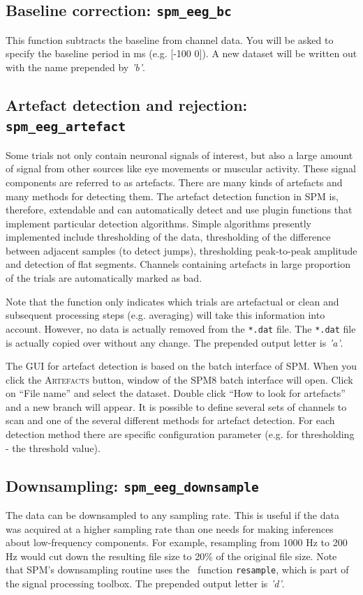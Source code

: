\subsection{Baseline correction: \texttt{spm\_eeg\_bc}} 
This function subtracts the baseline from channel data. You will be asked to specify the baseline period in ms (e.g. [-100 0]). A new dataset will be written out with the name prepended by \textit{'b'}.

\subsection{Artefact detection and rejection: \texttt{spm\_eeg\_artefact}}
Some trials not only contain neuronal signals of interest, but also a large amount of signal from other sources like eye movements or muscular activity. These signal components are referred to as artefacts. There are many kinds of artefacts and many methods for detecting them. The artefact detection function in SPM is, therefore, extendable and can automatically detect and use plugin functions that implement particular detection algorithms. Simple algorithms presently implemented include thresholding of the data, thresholding of the difference between adjacent samples (to detect jumps), thresholding peak-to-peak amplitude and detection of flat segments. Channels containing artefacts in large proportion of the trials are automatically marked as bad. 

Note that the function only indicates which trials are artefactual or clean and subsequent processing steps (e.g. averaging) will take this information into account. However, no data is actually removed from the \texttt{*.dat} file. The \texttt{*.dat} file is actually copied over without any change. The prepended output letter is \textit{'a'}.

The GUI for artefact detection is based on the batch interface of SPM. When you click the \textsc{Artefacts} button, window of the SPM8 batch interface will open. Click on ``File name'' and select the dataset.  Double click ``How to look for artefacts'' and a new branch will appear. It is possible to define several sets of channels to scan and one of the several different methods for artefact detection. For each detection method there are specific configuration parameter (e.g. for thresholding - the threshold value).

\subsection{Downsampling: \texttt{spm\_eeg\_downsample}}
The data can be downsampled to any sampling rate. This is useful if the data was acquired at a higher sampling rate than one needs for making inferences about low-frequency components. For example, resampling from 1000 Hz to 200 Hz would cut down the resulting file size to 20\% of the original file size. Note that SPM's downsampling routine uses the \matlab\ function \texttt{resample}, which is part of the signal processing toolbox. The prepended output letter is \textit{'d'}.


